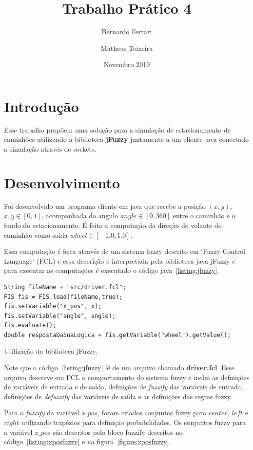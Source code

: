 \documentclass[12pt, a4paper]{article}
\title{Trabalho Prático 4}
\author{Bernardo Ferrari \and Matheus Teixeira}
\date{Novembro 2019}
\begin{document}
\maketitle

\section{Introdução}

Esse trabalho propõem uma solução para a simulação de estacionamento de
caminhões utilizando a biblioteca \textbf{jFuzzy} juntamente a um cliente
java conectado a simulação através de sockets.

\section{Desenvolvimento}

Foi desenvolvido um programa cliente em java que recebe a posição $(x, y)$, $x, y \in [0, 1]$,
acompanhada do angulo $angle \in [0, 360]$ entre o caminhão e o fundo do estacionamento.
É feita a computação da direção do volante do caminhão como saída $wheel \in [-1.0, 1.0]$.

Essa computação é feita através de um sistema fuzzy descrito em `Fuzzy Control Language' (FCL) e
essa descrição é interpretada pela biblioteca java jFuzzy e para executar as computações é executado
o código java~\ref{listing:jfuzzy}.

\begin{listing}[h!]
  \begin{verbatim}
String fileName = "src/driver.fcl";
FIS fis = FIS.load(fileName,true);
fis.setVariable("x_pos", x);
fis.setVariable("angle", angle);
fis.evaluate();
double respostaDaSuaLogica = fis.getVariable("wheel").getValue();
  \end{verbatim}
  \caption{Utilização da biblioteca jFuzzy.}\label{listing:jfuzzy}
\end{listing}

Note que o código~\ref{listing:jfuzzy} lê de um arquivo chamado \textbf{driver.fcl}.
Esse arquivo descreve em FCL o comportamento do sistema fuzzy e inclui as definições
de variáveis de entrada e de saída, definições de \textit{fuzzify} das variáveis de entrada,
definições de \textit{defuzzify} das variáveis de saída e as definições das regras fuzzy.

Para o \textit{fuzzify} da variável $x\_pos$, foram criados conjuntos fuzzy para $center$, $left$ e $right$ utilizando trapézios para definição probabilidades.
Os conjuntos fuzzy para a variável $x\_pos$ são descritos pelo bloco fuzzify descritos no código~\ref{listing:xposfuzzy} e na figura~\ref{figure:xposfuzzy}.
\end{document}
